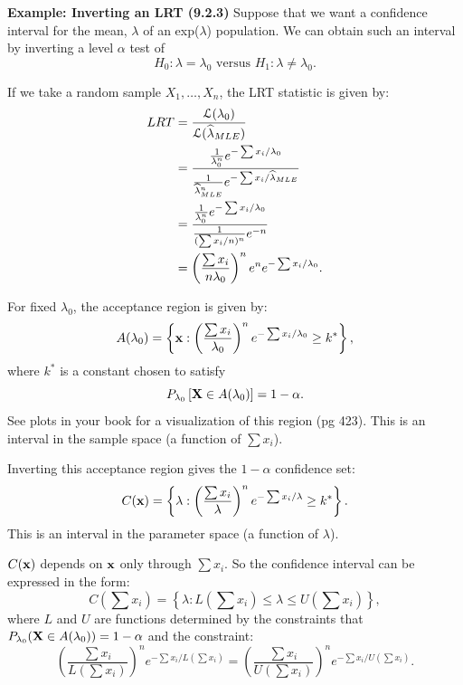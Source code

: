 \documentclass[11pt,]{article}
\newcommand{\Xndots}{X_1, \ldots, X_n}
\def\bx{{\bf x}}
\def\bX{{\bf X}}
\def\lambdahat{{\widehat\lambda}}
\def\Lsc{{\cal L}}
\begin{document}
\textbf{Example: Inverting an LRT (9.2.3)} Suppose that we want a
confidence interval for the mean, \(\lambda\) of an exp(\(\lambda\))
population. We can obtain such an interval by inverting a level
\(\alpha\) test of
\[H_0: \lambda = \lambda_0 \mbox{ versus } H_1: \lambda \neq \lambda_0.\]

If we take a random sample \(\Xndots\), the LRT statistic is given by:
\begin{align*} 
LRT &= \frac{\Lsc(\lambda_0)}{\Lsc(\lambdahat_{MLE})}\\
&= \frac{\frac{1}{\lambda_0^n} e^{-\sum x_i/\lambda_0}}{ \frac{1}{\lambdahat_{MLE}^n} e^{-\sum x_i/\lambdahat_{MLE}}}\\
&= \frac{\frac{1}{\lambda_0^n} e^{-\sum x_i/\lambda_0}}{\frac{1}{(\sum x_i/n)^n} e^{-n}}\\
&= \left(\frac{\sum x_i}{n \lambda_0}\right)^n e^{n} e^{-\sum x_i /\lambda_0}.
\end{align*}

For fixed \(\lambda_0\), the acceptance region is given by:
\begin{equation*}
A(\lambda_0) = \left\{ \bx: \left(\frac{\sum x_i}{\lambda_0}\right)^n e^{-\sum x_i /\lambda_0} \geq k^*\right\},
\end{equation*} where \(k^*\) is a constant chosen to satisfy
\[P_{\lambda_0} \left[\bX \in A(\lambda_0)\right] = 1 - \alpha.\] See
plots in your book for a visualization of this region (pg 423). This is
an interval in the sample space (a function of \(\sum x_i\)).

Inverting this acceptance region gives the \(1-\alpha\) confidence set:
\[C(\bx) = \left\{ \lambda: \left(\frac{\sum x_i}{\lambda}\right)^n e^{-\sum x_i /\lambda} \geq k^*\right\}.\]
This is an interval in the parameter space (a function of \(\lambda\)).

\(C(\bx)\) depends on \(\bx\) only through \(\sum x_i\). So the
confidence interval can be expressed in the form:
\[C\left(\sum x_i\right) = \left\{ \lambda: L\left(\sum x_i\right) \leq \lambda \leq U\left(\sum x_i\right)\right\},\]
where \(L\) and \(U\) are functions determined by the constraints that
\(P_{\lambda_0} (\bX \in A(\lambda_0)) = 1 - \alpha\) and the
constraint: \begin{equation*}
\left( \frac{\sum x_i}{L(\sum x_i) } \right)^n e^{-\sum x_i /L(\sum x_i)} = \left( \frac{\sum x_i}{U(\sum x_i) } \right)^n e^{-\sum x_i /U(\sum x_i)}. \tag{9.2.4}
\end{equation*}
\end{document}
